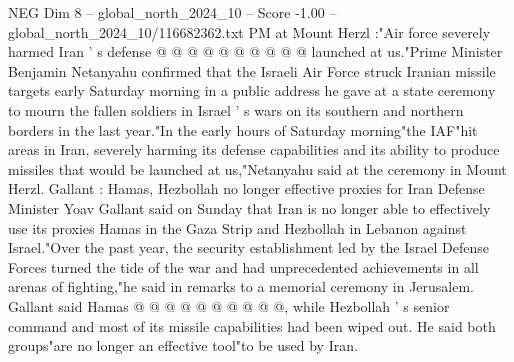 \begin{textsample}{NEG Dim 8 – global\_north\_2024\_10 – Score -1.00 – global\_north\_2024\_10/116682362.txt}
PM at Mount Herzl :"Air force severely harmed Iran ' s defense @ @ @ @ @ @ @ @ @ @ launched at us."Prime Minister Benjamin Netanyahu confirmed that the Israeli Air Force struck Iranian missile targets early Saturday morning in a public address he gave at a state ceremony to mourn the fallen soldiers in Israel ' s wars on its southern and northern borders in the last year."In the early hours of Saturday morning"the IAF"hit areas in Iran, severely harming its defense capabilities and its ability to produce missiles that would be launched at us,"Netanyahu said at the ceremony in Mount Herzl.
Gallant : Hamas, Hezbollah no longer effective proxies for Iran Defense Minister Yoav Gallant said on Sunday that Iran is no longer able to effectively use its proxies Hamas in the Gaza Strip and Hezbollah in Lebanon against Israel."Over the past year, the security establishment led by the Israel Defense Forces turned the tide of the war and had unprecedented achievements in all arenas of fighting,"he said in remarks to a memorial ceremony in Jerusalem.
Gallant said Hamas @ @ @ @ @ @ @ @ @ @, while Hezbollah ' s senior command and most of its missile capabilities had been wiped out.
He said both groups"are no longer an effective tool"to be used by Iran.

\end{textsample}
